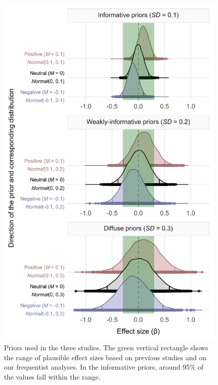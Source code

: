 \documentclass[
  12pt,
  man,floatsintext]{apa7}
\begin{document}
\begin{figure}

{\centering \includegraphics[width=1\linewidth]{../bayesian_priors/plots/bayesian_priors} 

}

\caption{Priors used in the three studies. The green vertical rectangle shows the range of plausible effect sizes based on previous studies and on our frequentist analyses. In the informative priors, around 95\% of the values fall within the range.}\label{fig:bayesian-priors}
\end{figure}
\end{document}
